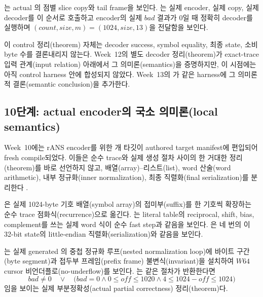 \begin{verified}
는 actual
의 점별 slice copy와 tail frame을 보인다.
는 실제 encoder,
실제 copy, 실제 decoder를 이 순서로 호출하고 encoder의 실제 \(bad\) 결과가
0일 때 정확히 decoder를 실행하며 \((count,size,m)=(1024,\mathit{size},13)\)을
전달함을 보인다.
\end{verified}

이 control 정리(theorem) 자체는 decoder success, symbol equality, 최종 state,
소비 byte 수를 결론내리지 않는다. Week~12의 별도 decoder 정리(theorem)가
exact-trace 입력 관계(input relation) 아래에서 그 의미론(semantics)을 증명하지만,
이 시점에는 아직 control harness 안에 합성되지 않았다. Week~13의
가 같은 harness에 그
의미론적 결론(semantic conclusion)을 추가한다.

\subsection{10단계: actual encoder의 국소 의미론(local semantics)}

Week~10에는 rANS encoder를 위한 \WeekTenTargetCount 개 타깃이 authored target
manifest에 편입되어 fresh compile되었다. 이들은 순수 trace와 실제 생성 절차
사이의 한 거대한 정리(theorem)를 바로 선언하지 않고, 배열(array)--리스트(list),
word 산술(word arithmetic), 내부 정규화(inner normalization), 최종 직렬화(final
serialization)를 분리한다 \cite{week10-report,rans-encoder-invariant}.

\begin{verified}
은 실제 1024-byte 기호 배열(symbol
array)의 접미부(suffix)를 한 기호씩 확장하는 순수 trace 점화식(recurrence)으로
옮긴다. 는 literal table의
reciprocal, shift, bias, complement를 쓰는 실제 word 식이 순수 fast step과 같음을
보인다. 은 네 번의
이 32-bit state의 little-endian 직렬화(serialization)와 같음을
보인다.
\end{verified}

\begin{verified}
는 실제 generated
의 중첩 정규화 루프(nested normalization loop)에
바이트 구간(byte segment)과 접두부 프레임(prefix frame) 불변식(invariant)을
설치하여 \(W64\) cursor 비언더플로(no-underflow)를 보인다.
는 같은 절차가 반환한다면
\[
  bad\ne0\quad\lor\quad
  \bigl(bad=0\land 0\le off\le1020\land
        4\le1024-off\le1024\bigr)
\]
임을 보이는 실제 부분정확성(actual partial correctness) 정리(theorem)다.
\end{verified}

